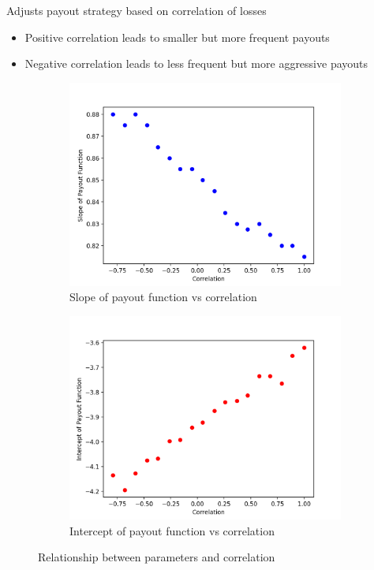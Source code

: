 \documentclass{beamer}
\begin{document}
\begin{frame}{Adjusts payout strategy based on correlation of losses}
\begin{itemize}
    \item Positive correlation leads to smaller but more frequent payouts
    \item Negative correlation leads to less frequent but more aggressive payouts
\end{itemize}
\begin{figure}
\centering
  \begin{subfigure}[b]{0.45\textwidth}
    \includegraphics[width=\textwidth]{../../../output/figures/Presentation/slope_vs_corr.png}
    \caption{Slope of payout function vs correlation}
  \end{subfigure}
 \hfill
  \begin{subfigure}[b]{0.45\textwidth}
    \includegraphics[width=\textwidth]{../../../output/figures/Presentation/intercept_vs_corr.png}
    \caption{Intercept of payout function vs correlation}
  \end{subfigure}
  \caption{Relationship between parameters and correlation}
\end{figure}
    
\end{frame}
\end{document}
